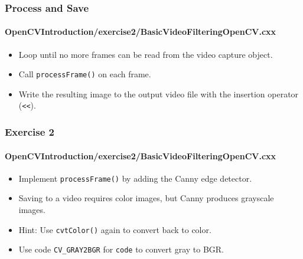\begin{frame}
\frametitle{Process and Save}
\framesubtitle{OpenCVIntroduction/exercise2/BasicVideoFilteringOpenCV.cxx}
\begin{center}
\begin{itemize}
\item Loop until no more frames can be read from the video capture object.
\item Call {\tt\small processFrame()} on each frame.
\item Write the resulting image to the output video file with the insertion operator ({\tt\small <<}).
\end{itemize}
\end{center}
\end{frame}


\begin{frame}
\frametitle{Exercise 2}
\framesubtitle{OpenCVIntroduction/exercise2/BasicVideoFilteringOpenCV.cxx}
\begin{center}
\begin{itemize}
\item Implement {\tt\small processFrame()} by adding the Canny edge detector.
\pause
\item Saving to a video requires color images, but Canny produces grayscale images.
\item Hint: Use {\tt\small cvtColor()} again to convert back to color.
\item Use code {\tt\small CV\_GRAY2BGR} for {\tt\small code} to convert gray to BGR.
\end{itemize}
\end{center}
\end{frame}
